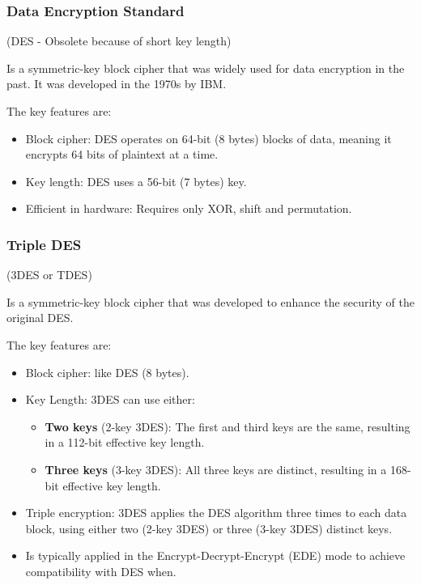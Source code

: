 \subsubsection{Data Encryption Standard}
\begin{center}
    (DES - Obsolete because of short key length)
\end{center}
Is a symmetric-key block cipher that was widely used for data encryption in the past. It was developed in the 1970s by IBM.

The key features are:
\begin{itemize}
    \item Block cipher: DES operates on 64-bit (8 bytes) blocks of data, meaning it encrypts 64 bits of plaintext at a time.
    \item Key length: DES uses a 56-bit (7 bytes) key.
    \item Efficient in hardware: Requires only XOR, shift and permutation.
\end{itemize}

\subsubsection{Triple DES}
\begin{center}
    (3DES or TDES)
\end{center}

Is a symmetric-key block cipher that was developed to enhance the security of the original DES.

The key features are:
\begin{itemize}
    \item Block cipher: like DES (8 bytes).
    \item Key Length: 3DES can use either:
    \begin{itemize}
        \item \textbf{Two keys} (2-key 3DES): The first and third keys are the same, resulting in a 112-bit effective key length.
        \item \textbf{Three keys} (3-key 3DES): All three keys are distinct, resulting in a 168-bit effective key length.
    \end{itemize}
    \item Triple encryption: 3DES applies the DES algorithm three times to each data block, using either two (2-key 3DES) or three (3-key 3DES) distinct keys.
    \item Is typically applied in the Encrypt-Decrypt-Encrypt (EDE) mode to achieve compatibility with DES when.
\end{itemize}

